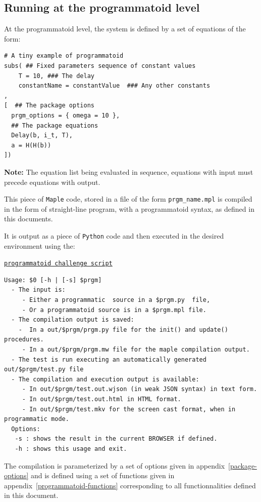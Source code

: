 \documentclass[a4]{article} \usepackage[left=2cm,right=3cm,top=1cm,bottom=2cm]{geometry}
\begin{document}
\subsection{Running at the programmatoid level}

At the programmatoid level, the system is defined by a set of equations of the form: \begin{verbatim}
# A tiny example of programmatoid
subs( ## Fixed parameters sequence of constant values
    T = 10, ### The delay
    constantName = constantValue  ### Any other constants
,
[  ## The package options 
  prgm_options = { omega = 10 },
  ## The package equations
  Delay(b, i_t, T),
  a = H(H(b))
])\end{verbatim}

{\bf Note:} The equation list being evaluated in sequence, equations with input must precede equations with output.

This piece of {\tt Maple} code, stored in a file of the form {\tt prgm\_name.mpl} is compiled in the form of straight-line program, with a programmatoid syntax, as defined in this documents.

It is output as a piece of {\tt Python} code and then executed in the desired environment using the:
\begin{center}\href{https://github.com/vthierry/braincraft/blob/master/braincraft/programmatoid_challenge.sh}{\tt programmatoid challenge script}\end{center}
\begin{verbatim}
Usage: $0 [-h | [-s] $prgm]
  - The input is:
     - Either a programmatic  source in a $prgm.py  file,
     - Or a programmatoid source is in a $prgm.mpl file.
  - The compilation output is saved:
    -  In a out/$prgm/prgm.py file for the init() and update() procedures.
     - In a out/$prgm/prgm.mw file for the maple compilation output.
  - The test is run executing an automatically generated out/$prgm/test.py file
  - The compilation and execution output is available:
     - In out/$prgm/test.out.wjson (in weak JSON syntax) in text form.
     - In out/$prgm/test.out.html in HTML format.
     - In out/$prgm/test.mkv for the screen cast format, when in programmatic mode.
  Options:
   -s : shows the result in the current BROWSER if defined.
   -h : shows this usage and exit.
\end{verbatim}

The compilation is parameterized by a set of options given in appendix~\ref{package-options} and is defined using a set of functions given in appendix~\ref{programmatoid-functions} corresponding to all functionnalities defined in this document.
\end{document}
